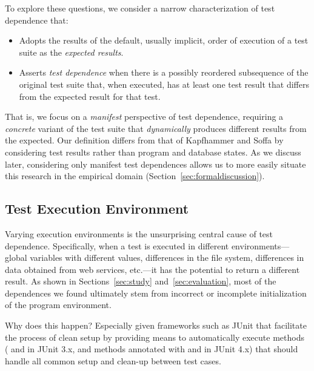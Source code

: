 To explore these questions, we consider a narrow characterization
of test dependence that:
\begin{itemize}
\item Adopts the results of the default, usually implicit,
  order of execution of a test suite as the \emph{expected results}. 
\item Asserts \emph{test dependence\/} when there is a possibly
  reordered subsequence of the original test suite that, when
  executed, has at least one test result that differs from the
  expected result for that test.  
\end{itemize}
That is, we focus on a \emph{manifest\/} perspective of test dependence,
requiring a \emph{concrete\/} variant of the test suite that
\emph{dynamically\/} produces different results from the expected.  Our
definition differs from that of Kapfhammer and Soffa by considering
test results rather than program and database states.
As we discuss later, considering only manifest test dependences allows
us to more easily situate this research in the empirical domain (Section~\ref{sec:formaldiscussion}).



\subsection{Test Execution Environment}

Varying execution environments is the unsurprising central
cause of test dependence. Specifically, when a
test is executed in different environments---global variables
with different values, differences in the file system, differences in
data obtained from web services, etc.---it has the potential to return
a different result.  
As shown in Sections~\ref{sec:study} and~\ref{sec:evaluation}, most of the dependences we found
ultimately stem from incorrect or incomplete initialization
of the program environment.

Why does this happen? Especially given frameworks such as
JUnit that facilitate the process of clean setup by providing means to
automatically execute methods ( and  in JUnit
3.x, and methods annotated with  and  in
JUnit 4.x) that should handle all common setup and clean-up between
test cases. 

